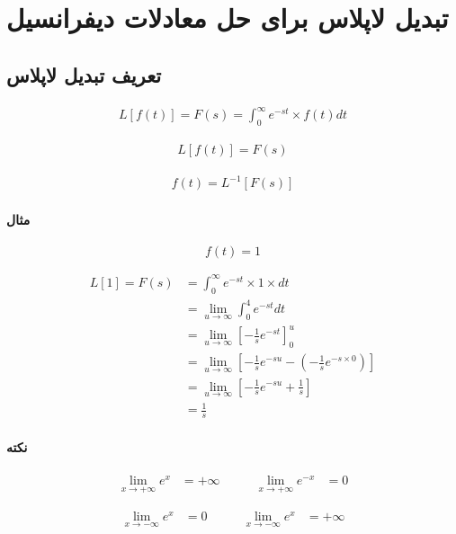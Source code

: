 \documentclass[12pt]{book}
\begin{document}
\chapter{تبدیل لاپلاس برای حل معادلات دیفرانسیل}

\section{تعریف تبدیل لاپلاس}

\begin{align*}
L \left[ f(t) \right] = F(s) = \int_{0}^{\infty}{e^{-st} \times f(t) dt}
\end{align*}

\begin{align*}
L \left[ f(t) \right] = F(s) 
\end{align*}

\begin{align*}
f(t) = L^{-1} \left[ F(s) \right]
\end{align*}



\subsubsection{مثال}

$$
f(t) = 1
$$

\begin{align*}
L [ 1 ] = F(s) &= \int_{0}^{\infty}{e^{-st} \times 1 \times dt} \\
&= \lim_{u \to \infty}{\int_{0}^{4}{e^{-st}dt}} \\
&= \lim_{u \to \infty}{ \left[ -\frac{1}{s} e^{-st} \right]_{0}^{u} } \\
&= \lim_{u \to \infty}{ \left[ - \frac{1}{s} e^{-su} - \left( - \frac{1}{s} e^{-s \times 0} \right) \right] } \\
&= \lim_{u \to \infty}{ \left[ - \frac{1}{s} e^{-su} + \frac{1}{s} \right] } \\
&= \frac{1}{s} 
\end{align*}


\subsubsection{نکته}

{
\LARGE
\begin{align*}
\lim_{x \to +\infty}{e^{x}} &= + \infty &\qquad \lim_{x \to +\infty}{e^{-x}} &= 0 
\end{align*}

\begin{align*}
\lim_{x \to -\infty}{e^{x}} &= 0 &\qquad \lim_{x \to -\infty}{e^{x}} &= + \infty 
\end{align*}
}
\end{document}
